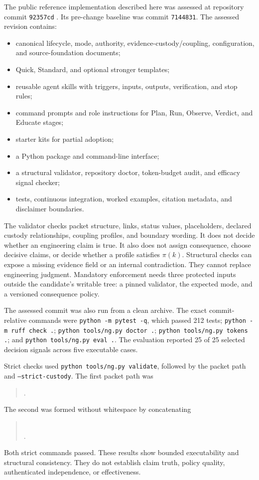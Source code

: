 \documentclass[11pt]{article}
\newcommand{\code}[1]{\texttt{#1}}
\begin{document}
The public reference implementation described here was assessed at repository commit \code{92357cd} \citep{flyfission2026repo}. Its pre-change baseline was commit \code{7144831}. The assessed revision contains:

\begin{itemize}
  \item canonical lifecycle, mode, authority, evidence-custody/coupling, configuration, and source-foundation documents;
  \item Quick, Standard, and optional stronger templates;
  \item reusable agent skills with triggers, inputs, outputs, verification, and stop rules;
  \item command prompts and role instructions for Plan, Run, Observe, Verdict, and Educate stages;
  \item starter kits for partial adoption;
  \item a Python package and command-line interface;
  \item a structural validator, repository doctor, token-budget audit, and efficacy signal checker;
  \item tests, continuous integration, worked examples, citation metadata, and disclaimer boundaries.
\end{itemize}

The validator checks packet structure, links, status values, placeholders, declared custody relationships, coupling profiles, and boundary wording. It does not decide whether an engineering claim is true. It also does not assign consequence, choose decisive claims, or decide whether a profile satisfies $\pi(k)$. Structural checks can expose a missing evidence field or an internal contradiction. They cannot replace engineering judgment. Mandatory enforcement needs three protected inputs outside the candidate's writable tree: a pinned validator, the expected mode, and a versioned consequence policy.

The assessed commit was also run from a clean archive. The exact commit-relative commands were \code{python -m pytest -q}, which passed 212 tests; \code{python -m ruff check .}; \code{python tools/ng.py doctor .}; \code{python tools/ng.py tokens .}; and \code{python tools/ng.py eval .}. The evaluation reported 25 of 25 selected decision signals across five executable cases.

Strict checks used \code{python tools/ng.py validate}, followed by the packet path and \code{--strict-custody}. The first packet path was
\begin{quote}
\small{}.
\end{quote}
The second was formed without whitespace by concatenating
\begin{quote}
\small{}\\[-0.3em]
.
\end{quote}
Both strict commands passed. These results show bounded executability and structural consistency. They do not establish claim truth, policy quality, authenticated independence, or effectiveness.
\end{document}

